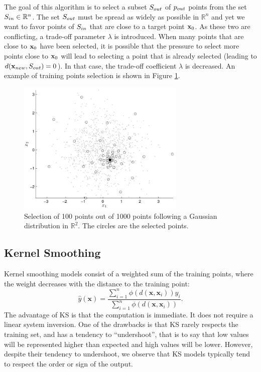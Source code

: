 \documentclass[12pt]{article}
\def\R{{\mathbb{R}}}
\newcommand{\x}{\mathbf{x}}
\newcommand{\yh}{\hat{y}}
\begin{document}
The goal of this algorithm is to select a subset $S_{out}$ of $p_{out}$ points from the set $\Sin \in \R^n$. The set $S_{out}$ must be spread as widely as possible in $\R^n$ and yet we want to favor points of $S_{in}$ that are close to a target point $\xtarget$. As these two are conflicting, a trade-off parameter $\lambda$ is introduced. 
When many points that are close to $\xtarget$ have been selected, it is possible that the pressure to select more points close to $\xtarget$ will lead to selecting a point that is already selected (leading to $d(\x_{new},\Sout)=0$). In that case, the trade-off coefficient $\lambda$ is decreased. 
An example of training points selection is shown in Figure \ref{fig:kernel-selection}. 



\begin{figure}[!ht]
	\center
  \includegraphics[width=8cm]{./includes/show_selectkernel_1.pdf}
  \caption{Selection of 100 points out of 1000 points following a Gaussian distribution in $\R^2$. The circles are the selected points.}
  \label{fig:kernel-selection}
\end{figure}






\subsection{Kernel Smoothing}
\label{sec:KS}

Kernel smoothing models consist of a weighted sum of the training points, where the weight decreases with the distance to the training point:
\begin{equation}
  \yh(\x) = \frac{ \sum_{i=1}^n \phi(d(\x,\x_i)) y_i }{ \sum_{i=1}^n \phi(d(\x,\x_i)) }.
\end{equation}
The advantage of KS is that the computation is immediate. It does not require a linear system inversion. One of the drawbacks is that KS rarely respects the training set, and has a tendency to ``undershoot'', that is to say that low values will be represented higher than expected and high values will be lower. However, despite their tendency to undershoot, we observe that KS models typically tend to respect the order or sign of the output. 
\end{document}
